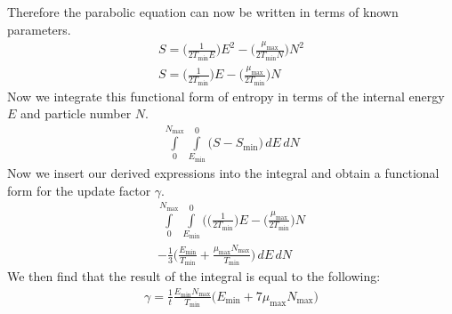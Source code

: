 \documentclass[letterpaper,twocolumn,amsmath,amssymb,pre,aps,10pt]{revtex4-1}
\newcommand{\Int}{\int\limits}
\begin{document}
Therefore the parabolic equation can now be written in terms of known parameters.
\begin{align}
S = \bigg( \frac{1}{2 T_{\min} E}\bigg) E^2 - \bigg( \frac{\mu_{\max}}{2 T_{\min} N}\bigg) N^2 \\
S = \bigg( \frac{1}{2 T_{\min}}\bigg) E - \bigg( \frac{\mu_{\max}}{2 T_{\min}}\bigg) N
\end{align}
Now we integrate this functional form of entropy in terms of the internal energy $E$ and particle number $N$.
\begin{align}
\Int_{0}^{N_{\max}} \Int_{E_{\min}}^{0} \bigg( S - S_{\min}\bigg) \,dE\,dN
\end{align}
Now we insert our derived expressions into the integral and obtain a functional form for the update factor $\gamma$.
\begin{align}
\Int_{0}^{N_{\max}} \Int_{E_{\min}}^{0} \bigg( \bigg( \frac{1}{2 T_{\min}}\bigg) E - \bigg( \frac{\mu_{\max}}{2 T_{\min}}\bigg) N \\- \frac{1}{3}\bigg( \frac{E_{\min}}{T_{\min}}  + \frac{\mu_{\max}N_{\max}}{T_{\min}} \bigg) \,dE\,dN
\end{align}
We then find that the result of the integral is equal to the following:
\begin{align}
\gamma =\frac{1}{t} \frac{E_{\min}N_{\max}}{T_{\min}}\bigg(E_{\min} + 7 \mu_{\max}N_{\max} \bigg)
\end{align}

\end{document}
